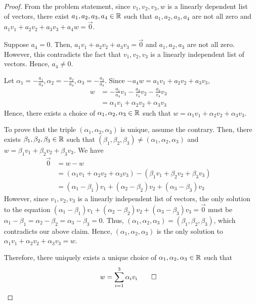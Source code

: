 \begin{proof}
    From the problem statement, since $v_1,v_2,v_3,w$ is a linearly dependent list of vectors, there exist $a_1,a_2,a_3,a_4\in\mathbb R$ such that $a_1,a_2,a_3,a_4$ are not all zero and $a_1v_1+a_2v_2+a_3v_3+a_4w=\vec{0}$.

    Suppose $a_4=0$. Then, $a_1v_1+a_2v_2+a_3v_3=\vec{0}$ and $a_1,a_2,a_3$ are not all zero. However, this contradicts the fact that $v_1,v_2,v_3$ is a linearly independent list of vectors. Hence, $a_4\not=0$.

    Let $\alpha_1=-\frac{a_1}{a_4},\alpha_2=-\frac{a_2}{a_4},\alpha_3=-\frac{a_3}{a_4}$. Since $-a_4w=a_1v_1+a_2v_2+a_3v_3$,
    \[
        \begin{aligned}
            w & = -\frac{a_1}{a_4}v_1-\frac{a_2}{v_4}v_2-\frac{a_3}{v_4}v_3 \\
              & = \alpha_1v_1+\alpha_2v_2+\alpha_3v_3
        \end{aligned}
    \]
    Hence, there exists a choice of $\alpha_1,\alpha_2,\alpha_3\in\mathbb R$ such that $w=\alpha_1v_1+\alpha_2v_2+\alpha_3v_3$.

    To prove that the triple $(\alpha_1,\alpha_2,\alpha_3)$ is unique, assume the contrary. Then, there exists $\beta_1,\beta_2,\beta_3\in\mathbb R$ such that $(\beta_1,\beta_2,\beta_3)\not=(\alpha_1,\alpha_2,\alpha_3)$ and $w=\beta_1v_1+\beta_2v_2+\beta_3v_3$. We have
    \[
        \begin{aligned}
            \vec{0} & = w-w                                                                      \\
                    & = (\alpha_1v_1+\alpha_2v_2+\alpha_3v_3)-(\beta_1v_1+\beta_2v_2+\beta_3v_3) \\
                    & = (\alpha_1-\beta_1)v_1+(\alpha_2-\beta_2)v_2+(\alpha_3-\beta_3)v_3
        \end{aligned}
    \]
    However, since $v_1,v_2,v_3$ is a linearly independent list of vectors, the only solution to the equation $(\alpha_1-\beta_1)v_1+(\alpha_2-\beta_2)v_2+(\alpha_3-\beta_3)v_3=\vec{0}$ must be $\alpha_1-\beta_1=\alpha_2-\beta_2=\alpha_3-\beta_3=0$. Thus, $(\alpha_1,\alpha_2,\alpha_3)=(\beta_1,\beta_2,\beta_3)$, which contradicts our above claim. Hence, $(\alpha_1,\alpha_2,\alpha_3)$ is the only solution to $\alpha_1v_1+\alpha_2v_2+\alpha_3v_3=w$.

    Therefore, there uniquely exists a unique choice of $\alpha_1,\alpha_2,\alpha_3\in\mathbb R$ such that 
    \renewcommand{\qedsymbol}{$\blacksquare$}
    \[
        w=\sum_{i=1}^{3}\alpha_iv_i\qed
    \]
    \renewcommand{\qedsymbol}{}
\end{proof}